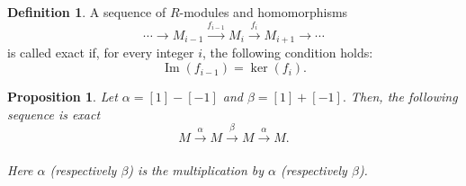 \documentclass[12t,a4paper]{amsart}
\newtheorem{prop}[thm]{Proposition}
\theoremstyle{definition}
\newtheorem{definition}[thm]{Definition}
\numberwithin{equation}{section}
\begin{document}
{ \begin{definition}
A sequence of \( R \)-modules and homomorphisms
\[
\cdots \to M_{i-1} \xrightarrow{f_{i-1}} M_i \xrightarrow{f_i} M_{i+1} \to \cdots
\]
is called exact if, for every integer \( i \), the following condition holds:
\[
\operatorname{Im}(f_{i-1}) = \ker(f_i).
\]
\end{definition}
\begin{prop}
Let $\alpha = [1]-[-1]$ and $\beta = [1]+[-1].$ Then, the following sequence is exact 
    \[ M \xrightarrow[]{\alpha} M  \xrightarrow[]{\beta} M \xrightarrow[]{\alpha} M. \]

    Here $\alpha$ (respectively $\beta$) is the multiplication by $\alpha$ (respectively $\beta$). 
\end{prop}

}
\end{document}
